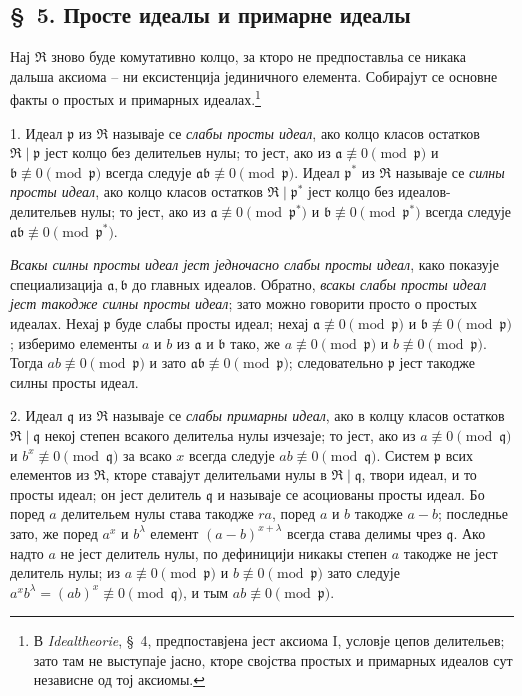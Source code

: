 \documentclass[11pt]{article}
\providecommand{\mR}{\mathfrak{R}}
\providecommand{\ma}{\mathfrak{a}}
\providecommand{\mb}{\mathfrak{b}}
\providecommand{\mq}{\mathfrak{q}}
\providecommand{\mpideal}{\mathfrak{p}}
\begin{document}
\setcounter{footnote}{19}

\subsection*{\S~5. Просте идеалы и примарне идеалы}

Нај $\mR$ зново буде комутативно колцо, за кторо не предпоставльа се никака дальша аксиома -- ни ексистенција јединичного елемента. Собирајут се основне факты о простых и примарных идеалах.\footnote{В \emph{Idealtheorie}, \S~4, предпоставјена јест аксиома I, условје цепов делительев; зато там не выступаје јасно, кторе својства простых и примарных идеалов сут независне од тој аксиомы.}

1. Идеал $\mpideal$ из $\mR$ называје се \emph{слабы просты идеал}, ако колцо класов остатков $\mR\mid\mpideal$ јест колцо без делительев нулы; то јест, ако из $\ma\not\equiv0\pmod{\mpideal}$ и $\mb\not\equiv0\pmod{\mpideal}$ всегда следује $\ma\mb\not\equiv0\pmod{\mpideal}$. Идеал $\mpideal^*$ из $\mR$ называје се \emph{силны просты идеал}, ако колцо класов остатков $\mR\mid\mpideal^*$ јест колцо без идеалов-делительев нулы; то јест, ако из $\ma\not\equiv0\pmod{\mpideal^*}$ и $\mb\not\equiv0\pmod{\mpideal^*}$ всегда следује $\ma\mb\not\equiv0\pmod{\mpideal^*}$.

\emph{Всакы силны просты идеал јест једночасно слабы просты идеал}, како показује специализација $\ma,\mb$ до главных идеалов. Обратно, \emph{всакы слабы просты идеал јест такодже силны просты идеал}; зато можно говорити просто о простых идеалах. Нехај $\mpideal$ буде слабы просты идеал; нехај $\ma\not\equiv0\pmod{\mpideal}$ и $\mb\not\equiv0\pmod{\mpideal}$; изберимо елементы $a$ и $b$ из $\ma$ и $\mb$ тако, же $a\not\equiv0\pmod{\mpideal}$ и $b\not\equiv0\pmod{\mpideal}$. Тогда $ab\not\equiv0\pmod{\mpideal}$ и зато $\ma\mb\not\equiv0\pmod{\mpideal}$; следовательно $\mpideal$ јест такодже силны просты идеал.

2. Идеал $\mq$ из $\mR$ называје се \emph{слабы примарны идеал}, ако в колцу класов остатков $\mR\mid\mq$ некој степен всакого делительа нулы изчезаје; то јест, ако из $a\not\equiv0\pmod{\mq}$ и $b^x\not\equiv0\pmod{\mq}$ за всако $x$ всегда следује $ab\not\equiv0\pmod{\mq}$. Систем $\mpideal$ всих елементов из $\mR$, кторе ставајут делительами нулы в $\mR\mid\mq$, твори идеал, и то просты идеал; он јест делитель $\mq$ и называје се асоциованы просты идеал. Бо поред $a$ делительем нулы става такодже $ra$, поред $a$ и $b$ такодже $a-b$; последнье зато, же поред $a^x$ и $b^\lambda$ елемент $(a-b)^{x+\lambda}$ всегда става делимы чрез $\mq$. Ако надто $a$ не јест делитель нулы, по дефиницији никакы степен $a$ такодже не јест делитель нулы; из $a\not\equiv0\pmod{\mpideal}$ и $b\not\equiv0\pmod{\mpideal}$ зато следује $a^x b^\lambda=(ab)^x\not\equiv0\pmod{\mq}$, и тым $ab\not\equiv0\pmod{\mpideal}$.
\end{document}
